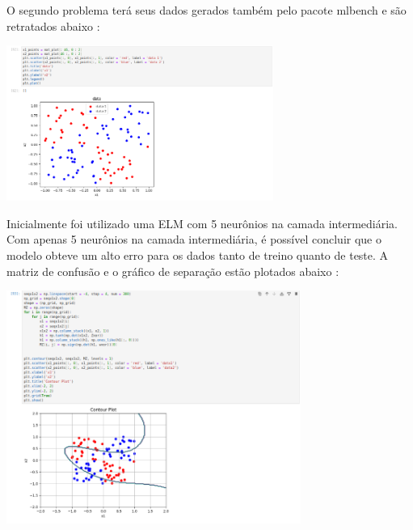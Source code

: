 \documentclass{article}
\begin{document}
O segundo problema terá seus dados gerados também pelo pacote mlbench e são retratados abaixo : 

\begin{center}

\includegraphics[height=2in]{exercise_pic/xor/plot_data_xor.png}

\end{center}
\vspace{5pt}
Inicialmente foi utilizado uma ELM com 5 neurônios na camada intermediária. Com apenas 5 neurônios na camada intermediária, é possível concluir que o modelo obteve um alto erro para os dados tanto de treino quanto de teste. A matriz de confusão e o gráfico de separação estão plotados abaixo :

\begin{center}

\includegraphics[height=3in]{exercise_pic/xor/plot_graph_xor_5.png}
\vspace{10pt}

\end{center}
\end{document}
